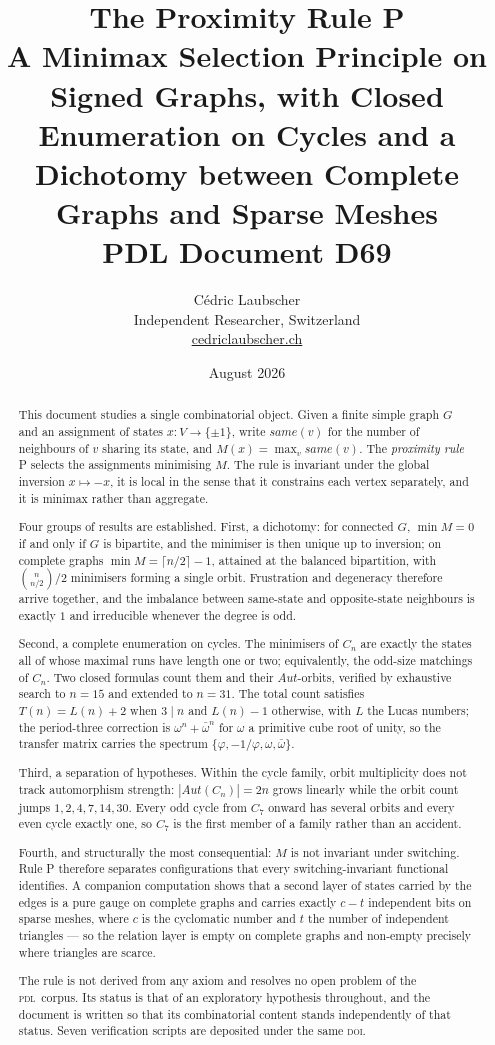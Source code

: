 \documentclass[11pt,a4paper]{article}
\title{\textbf{The Proximity Rule P}\texorpdfstring{\\[4pt]\large A Minimax Selection Principle on Signed Graphs, with Closed Enumeration on Cycles and a Dichotomy between Complete Graphs and Sparse Meshes}{: A Minimax Selection Principle on Signed Graphs}\\[6pt]
{\large PDL Document D69}}
\author{C\'edric Laubscher\\[4pt]
\small Independent Researcher, Switzerland\\
\small \href{https://cedriclaubscher.ch}{cedriclaubscher.ch}}
\date{August 2026}
\def\mathrm#1{#1}%
\newcommand{\PDL}{\textsc{pdl}}
\newcommand{\same}{\mathrm{same}}
\newcommand{\Aut}{\mathrm{Aut}}
\begin{document}
\maketitle

\begin{abstract}
This document studies a single combinatorial object. Given a finite simple graph $G$ and an assignment of states $x:V\to\{\pm1\}$, write $\same(v)$ for the number of neighbours of $v$ sharing its state, and $M(x)=\max_v\same(v)$. The \emph{proximity rule} P selects the assignments minimising $M$. The rule is invariant under the global inversion $x\mapsto-x$, it is local in the sense that it constrains each vertex separately, and it is minimax rather than aggregate.

Four groups of results are established. First, a dichotomy: for connected $G$, $\min M=0$ if and only if $G$ is bipartite, and the minimiser is then unique up to inversion; on complete graphs $\min M=\lceil n/2\rceil-1$, attained at the balanced bipartition, with $\binom{n}{n/2}/2$ minimisers forming a single orbit. Frustration and degeneracy therefore arrive together, and the imbalance between same-state and opposite-state neighbours is exactly $1$ and irreducible whenever the degree is odd.

Second, a complete enumeration on cycles. The minimisers of $C_n$ are exactly the states all of whose maximal runs have length one or two; equivalently, the odd-size matchings of $C_n$. Two closed formulas count them and their $\Aut$-orbits, verified by exhaustive search to $n=15$ and extended to $n=31$. The total count satisfies $T(n)=L(n)+2$ when $3\mid n$ and $L(n)-1$ otherwise, with $L$ the Lucas numbers; the period-three correction is $\omega^n+\bar\omega^n$ for $\omega$ a primitive cube root of unity, so the transfer matrix carries the spectrum $\{\varphi,-1/\varphi,\omega,\bar\omega\}$.

Third, a separation of hypotheses. Within the cycle family, orbit multiplicity does not track automorphism strength: $|\Aut(C_n)|=2n$ grows linearly while the orbit count jumps $1,2,4,7,14,30$. Every odd cycle from $C_7$ onward has several orbits and every even cycle exactly one, so $C_7$ is the first member of a family rather than an accident.

Fourth, and structurally the most consequential: $M$ is not invariant under switching. Rule P therefore separates configurations that every switching-invariant functional identifies. A companion computation shows that a second layer of states carried by the edges is a pure gauge on complete graphs and carries exactly $c-t$ independent bits on sparse meshes, where $c$ is the cyclomatic number and $t$ the number of independent triangles --- so the relation layer is empty on complete graphs and non-empty precisely where triangles are scarce.

The rule is not derived from any axiom and resolves no open problem of the \PDL\ corpus. Its status is that of an exploratory hypothesis throughout, and the document is written so that its combinatorial content stands independently of that status. Seven verification scripts are deposited under the same \textsc{doi}.
\end{abstract}
\end{document}
